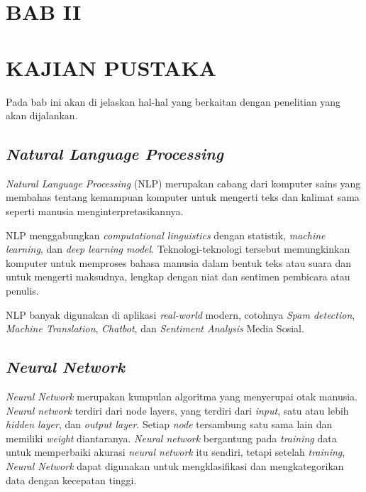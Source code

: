 \documentclass[12pt]{report}
\begin{document}
\newpage
\section[KAJIAN PUSTAKA]{BAB II}
\section*{KAJIAN PUSTAKA}
\thispagestyle{plain}
Pada bab ini akan di jelaskan hal-hal yang berkaitan dengan penelitian yang akan dijalankan.

\subsection{\textit{Natural Language Processing}}
\textit{Natural Language Processing} (NLP) merupakan cabang dari komputer sains yang membahas tentang kemampuan komputer untuk mengerti teks dan kalimat sama seperti manusia menginterpretasikannya.

NLP menggabungkan \textit{computational linguistics} dengan statistik, \textit{machine learning}, dan \textit{deep learning model}. Teknologi-teknologi tersebut memungkinkan komputer untuk memproses bahasa manusia dalam bentuk teks atau suara dan untuk mengerti maksudnya, lengkap dengan niat dan sentimen pembicara atau penulis.

NLP banyak digunakan di aplikasi \textit{real-world} modern, cotohnya \textit{Spam detection}, \textit{Machine Translation}, \textit{Chatbot}, dan \textit{Sentiment Analysis} Media Sosial.


\subsection{\textit{Neural Network}}
\textit{Neural Network} merupakan kumpulan algoritma yang menyerupai otak manusia. \textit{Neural network} terdiri dari {node layers}, yang terdiri dari \textit{input}, satu atau lebih \textit{hidden layer}, dan \textit{output layer}. Setiap \textit{node} tersambung satu sama lain dan memiliki \textit{weight} diantaranya. \textit{Neural network} bergantung pada \textit{training} data untuk memperbaiki akurasi \textit{neural network} itu sendiri, tetapi setelah \textit{training}, \textit{Neural Network} dapat digunakan untuk mengklasifikasi dan mengkategorikan data dengan kecepatan tinggi. 
\end{document}
